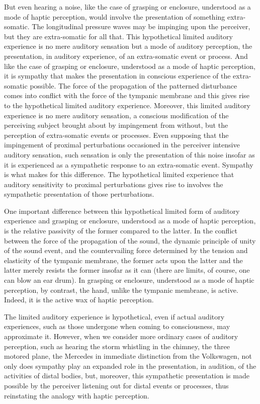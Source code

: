 But even hearing a noise, like the case of grasping or enclosure, understood as a mode of haptic perception, would involve the presentation of something extra-somatic. The longitudinal pressure waves may be impinging upon the perceiver, but they are extra-somatic for all that. This hypothetical limited auditory experience is no mere auditory sensation but a mode of auditory perception, the presentation, in auditory experience, of an extra-somatic event or process. And like the case of grasping or enclosure, understood as a mode of haptic perception, it is sympathy that makes the presentation in conscious experience of the extra-somatic possible. The force of the propagation of the patterned disturbance comes into conflict with the force of the tympanic membrane and this gives rise to the hypothetical limited auditory experience. Moreover, this limited auditory experience is no mere auditory sensation, a conscious modification of the perceiving subject brought about by impingement from without, but the perception of extra-somatic events or processes. Even supposing that the impingement of proximal perturbations occasioned in the perceiver intensive auditory sensation, such sensation is only the presentation of this noise insofar as it is experienced as a sympathetic response to an extra-somatic event. Sympathy is what makes for this difference. The hypothetical limited experience that auditory sensitivity to proximal perturbations gives rise to involves the sympathetic presentation of those perturbations. 

One important difference between this hypothetical limited form of auditory experience and grasping or enclosure, understood as a mode of haptic perception, is the relative passivity of the former compared to the latter. In the conflict between the force of the propagation of the sound, the dynamic principle of unity of the sound event, and the countervailing force determined by the tension and elasticity of the tympanic membrane, the former acts upon the latter and the latter merely resists the former insofar as it can (there are limits, of course, one can blow an ear drum). In grasping or enclosure, understood as a mode of haptic perception, by contrast, the hand, unlike the tympanic membrane, is active. Indeed, it is the active wax of haptic perception.

The limited auditory experience is hypothetical, even if actual auditory experiences, such as those undergone when coming to consciousness, may approximate it. However, when we consider more ordinary cases of auditory perception, such as hearing the storm whistling in the chimney, the three motored plane, the Mercedes in immediate distinction from the Volkswagen, not only does sympathy play an expanded role in the presentation, in audition, of the activities of distal bodies, but, moreover, this sympathetic presentation is made possible by the perceiver listening out for distal events or processes, thus reinstating the analogy with haptic perception.

